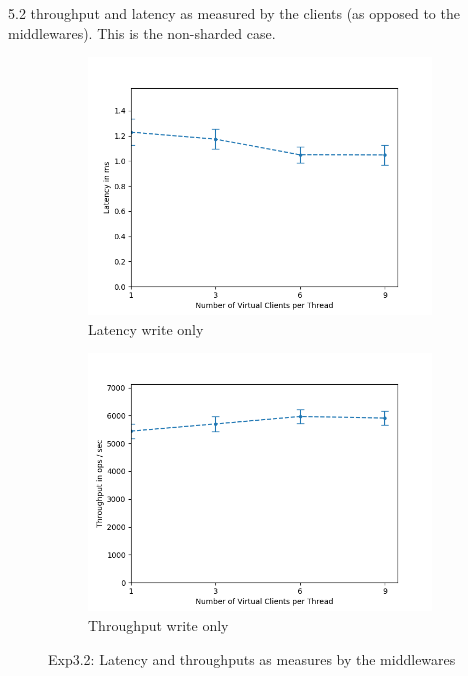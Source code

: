 \documentclass[11pt,a4paper]{article}
\begin{document}
5.2 throughput and latency as measured by the clients (as opposed to the middlewares).
This is the non-sharded case.

\begin{figure}[H]
\centering
\begin{subfigure}{.5\textwidth}
    \centering
    \includegraphics[width=\textwidth]{img/exp5_1/exp5_1__mw_latency_sharding_False.png}
    \caption{Latency write only}
    \label{fig:mesh1}
\end{subfigure}%
\begin{subfigure}{.5\textwidth}
      \centering
    \includegraphics[width=\textwidth]{img/exp5_1/exp5_1__mw_throughput_sharding_False.png}
    \caption{Throughput write only}
    \label{fig:mesh1}
\end{subfigure}
\caption{Exp3.2: Latency and throughputs as measures by the middlewares}
\label{fig:test}
\end{figure}
\end{document}
